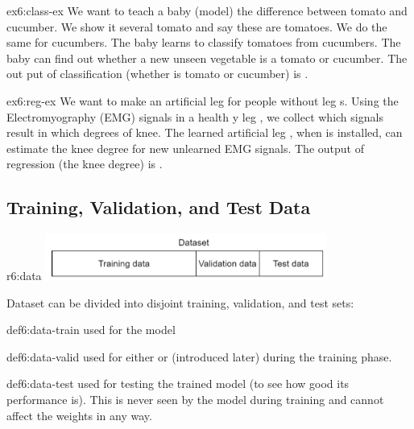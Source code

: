 \documentclass{tron}
\begin{document}
\clearpage
\begin{example}[Classification]{ex6:class-ex}
	We want to teach a baby (model) the difference between tomato and cucumber. We show it several tomato and say these are tomatoes. We do the same for cucumbers. The baby learns to classify tomatoes from cucumbers. The baby can find out whether a new unseen vegetable is a tomato or cucumber. The out put of classification (whether is tomato or cucumber) is .
\end{example}

\begin{example}[Regression]{ex6:reg-ex}
	 We want to make an artificial leg for people without leg s. Using the Electromyography (EMG) signals in a health y leg , we collect which signals result in which degrees of knee. The learned artificial leg , when is installed, can estimate the knee degree for new unlearned EMG signals. The output of regression (the knee degree) is .
\end{example}

\subsection{Training, Validation, and Test Data}
\begin{remark}{r6:data}
	\includegraphics[width=350px]{Figs/Lec6/dataset}
	
	Dataset can be divided into disjoint training, validation, and test sets:
	\begin{definition}{def6:data-train}
		used for  the model
	\end{definition}
	\begin{definition}{def6:data-valid}
 		used for either  or  (introduced later) during the training phase.
	\end{definition}
	\begin{definition}{def6:data-test}
		used for testing the trained model (to see how good its performance is). This is never seen by the model during training and cannot affect the weights in any way.
	\end{definition}
\end{remark}
\end{document}
